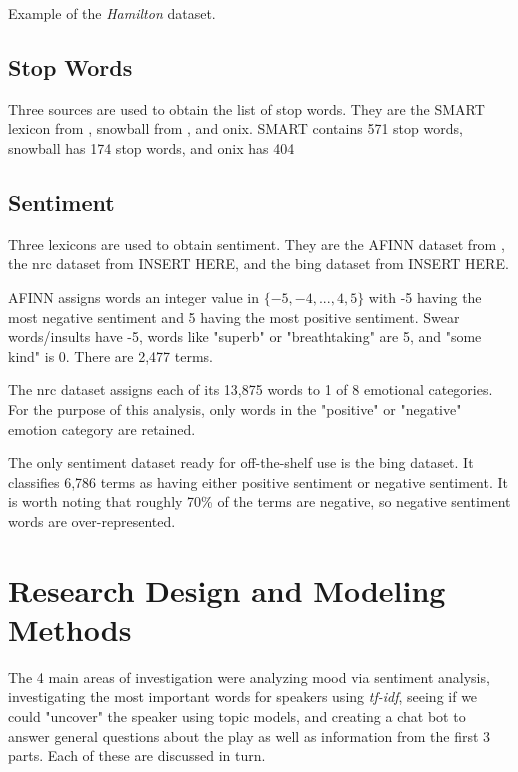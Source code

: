 \documentclass{article}
\begin{document}
\begin{table}
\caption{Example of the \emph{Hamilton} dataset.}
\label{tab:example}

\end{table}

\subsection{Stop Words}

Three sources are used to obtain the list of stop words. They are the SMART lexicon from \cite{Lewis2004}, snowball from \cite{snowball}, and onix. SMART contains 571 stop words, snowball has 174 stop words, and onix has 404

\subsection{Sentiment}

Three lexicons are used to obtain sentiment. They are the AFINN dataset from \cite{nielsen11}, the nrc dataset from INSERT HERE, and the bing dataset from INSERT HERE.

AFINN assigns words an integer value in $\{-5, -4, ..., 4, 5\}$ with -5 having the most negative sentiment and 5 having the most positive sentiment. Swear words/insults have -5, words like "superb" or "breathtaking" are 5, and "some kind" is 0. There are 2,477 terms. 

The nrc dataset assigns each of its 13,875 words to 1 of 8 emotional categories. For the purpose of this analysis, only words in the "positive" or "negative" emotion category are retained. 

The only sentiment dataset ready for off-the-shelf use is the bing dataset. It classifies 6,786 terms as having either positive sentiment or negative sentiment. It is worth noting that roughly 70\% of the terms are negative, so negative sentiment words are over-represented. 


\section{Research Design and Modeling Methods}

The 4 main areas of investigation were analyzing mood via sentiment analysis, investigating the most important words for speakers using \emph{tf-idf}, seeing if we could "uncover" the speaker using topic models, and creating a chat bot to answer general questions about the play as well as information from the first 3 parts. Each of these are discussed in turn.
\end{document}
